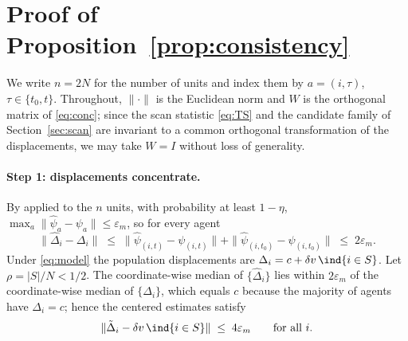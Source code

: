 \section{Proof of Proposition~\ref{prop:consistency}}
\label{app:proofs}

We write $n=2N$ for the number of units and index them by $a=(i,\tau)$, $\tau\in\{t_0,t\}$. Throughout, $\|\cdot\|$ is the Euclidean norm and $W$ is the orthogonal matrix of \eqref{eq:conc}; since the scan statistic \eqref{eq:TS} and the candidate family of Section~\ref{sec:scan} are invariant to a common orthogonal transformation of the displacements, we may take $W=I$ without loss of generality.

\paragraph{Step 1: displacements concentrate.}
By \citet[Theorem~1]{pkps2026} applied to the $n$ units, with probability at least $1-\eta$,
$\max_a\|\hat\psi_a-\psi_a\|\le\varepsilon_m$, so for every agent
\begin{equation}
\label{eq:disp-conc}
\|\hat\Delta_i-\Delta_i\| \;\le\; \|\hat\psi_{(i,t)}-\psi_{(i,t)}\| + \|\hat\psi_{(i,t_0)}-\psi_{(i,t_0)}\| \;\le\; 2\varepsilon_m .
\end{equation}
Under \eqref{eq:model} the population displacements are $\Delta_i = c + \delta v\,\ind\{i\in S\}$. Let $\rho=|S|/N<1/2$. The coordinate-wise median of $\{\hat\Delta_i\}$ lies within $2\varepsilon_m$ of the coordinate-wise median of $\{\Delta_i\}$, which equals $c$ because the majority of agents have $\Delta_i=c$; hence the centered estimates satisfy
\begin{equation}
\label{eq:centered}
\|\tilde\Delta_i - \delta v\,\ind\{i\in S\}\| \;\le\; 4\varepsilon_m \qquad\text{for all } i .
\end{equation}

